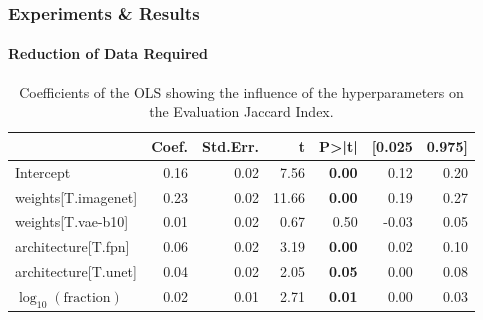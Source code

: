 \documentclass[t,aspectratio=169]{beamer}
\begin{document}
\begin{frame}[fragile]
  \frametitle{Experiments \& Results}
  \framesubtitle{Reduction of Data Required}
  \begin{table}
    \centering
    \caption{Coefficients of the OLS showing the influence of the hyperparameters on the Evaluation Jaccard Index.}
    \color{black}
    \begin{tabular}{lrrrrrr}
      \toprule
                                   & Coef. & Std.Err. & t     & P>|t|         & [0.025 & 0.975] \\
      \midrule
      Intercept                    & 0.16  & 0.02     & 7.56  & \textbf{0.00} & 0.12   & 0.20   \\
      weights[T.imagenet]          & 0.23  & 0.02     & 11.66 & \textbf{0.00} & 0.19   & 0.27   \\
      weights[T.vae-b10]           & 0.01  & 0.02     & 0.67  & 0.50          & -0.03  & 0.05   \\
      architecture[T.fpn]          & 0.06  & 0.02     & 3.19  & \textbf{0.00} & 0.02   & 0.10   \\
      architecture[T.unet]         & 0.04  & 0.02     & 2.05  & \textbf{0.05} & 0.00   & 0.08   \\
      $\log_{10}(\text{fraction})$ & 0.02  & 0.01     & 2.71  & \textbf{0.01} & 0.00   & 0.03   \\
      \bottomrule
    \end{tabular}
    
  \end{table}
  
  
\end{frame}
\end{document}
